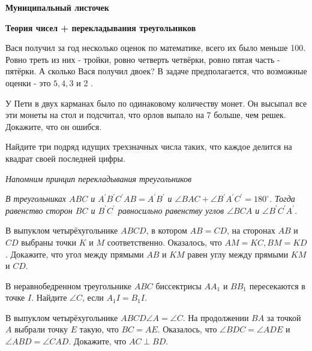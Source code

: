 \centerline{\bf \Huge Муниципальный листочек}
\centerline{\bf \Huge Теория чисел + перекладывания треугольников}

Вася получил за год несколько оценок по математике, всего их было меньше 100. Ровно треть из них - тройки, ровно четверть четвёрки, ровно пятая часть - пятёрки. А сколько Вася получил двоек? В задаче предполагается, что возможные оценки - это $5,4,3$ и 2 .

У Пети в двух карманах было по одинаковому количеству монет. Он высыпал все эти монеты на стол и подсчитал, что орлов выпало на 7 больше, чем решек. Докажите, что он ошибся.


Найдите три подряд идущих трехзначных числа таких, что каждое делится на квадрат своей последней цифры.


\textit{Напомним принцип перекладывания треугольников}

\textit{В треугольниках $A B C$ и $A^{\prime} B^{\prime} C^{\prime} A B=A^{\prime} B^{\prime}$ и $\angle B A C+\angle B^{\prime} A^{\prime} C^{\prime}= 180^{\circ}$. Тогда равенство сторон $B C$ и $B^{\prime} C^{\prime}$ равносильно равенству углов $\angle B C A$ и $\angle B^{\prime} C^{\prime} A^{\prime}$.}

В выпуклом четырёхугольнике $A B C D$, в котором $A B=C D$, на сторонах $A B$ и $C D$ выбраны точки $K$ и $M$ соответственно. Оказалось, что $A M=K C, B M=K D$. Докажите, что угол между прямыми $A B$ и $K M$ равен углу между прямыми $K M$ и $C D$.

В неравнобедренном треугольнике $A B C$ биссектрисы $A A_1$ и $B B_1$ пересекаются в точке $I$. Найдите $\angle C$, если $A_1 I=B_1 I$.

В выпуклом четырёхугольнике $A B C D \angle A=\angle C$. На продолжении $B A$ за точкой $A$ выбрали точку $E$ такую, что $B C=A E$. Оказалось, что $\angle B D C=\angle A D E$ и $\angle A B D= \angle C A D$. Докажите, что $A C \perp B D$.